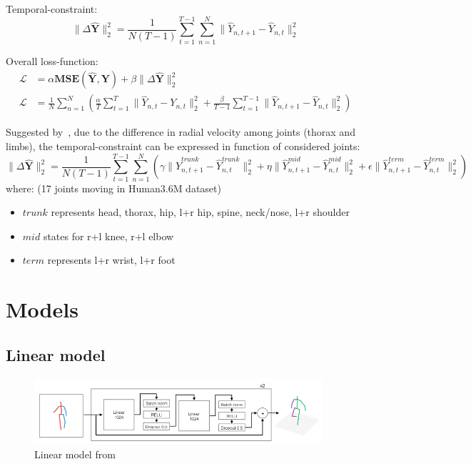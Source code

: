 \documentclass[12pt,a4paper,onecolumn]{article}
\begin{document}
Temporal-constraint:
\begin{equation}
	\lVert \Delta \widehat{\bm{Y}} \rVert_2^2 = \frac{1}{N(T-1)} \sum_{t = 1}^{T-1}\sum_{n = 1}^N \lVert \widehat{Y}_{n,t + 1} - \widehat{Y}_{n,t} \rVert_2^2
\end{equation}

Overall loss-function:
\begin{align}
	\bm{\mathcal{L}} &= \alpha\bm{MSE}(\widehat{\bm{Y}}, \bm{Y}) + \beta \lVert \Delta \widehat{\bm{Y}} \rVert_2^2\\
	\bm{\mathcal{L}} &= \frac{1}{N}\sum_{n=1}^N\left(\frac{\alpha}{T}\sum_{t=1}^T\rVert \widehat{Y}_{n,t} - Y_{n,t} \lVert_2^2 + \frac{\beta}{T-1}\sum_{t = 1}^{T-1}\lVert \widehat{Y}_{n,t + 1} - \widehat{Y}_{n,t}\rVert_2^2\right)
\end{align}

Suggested by~\cite{hossain2017exploiting}, due to the difference in radial velocity among joints (thorax and limbs), the temporal-constraint can be expressed in function of considered joints:
\begin{equation}
	\lVert \Delta \widehat{\bm{Y}} \rVert_2^2 = \frac{1}{N(T-1)} \sum_{t = 1}^{T-1}\sum_{n = 1}^N \left( \gamma \lVert \widehat{Y}_{n,t + 1}^{trunk} - \widehat{Y}_{n,t}^{trunk} \rVert_2^2 + \eta \lVert \widehat{Y}_{n,t + 1}^{mid} - \widehat{Y}_{n,t}^{mid} \rVert_2^2 + \epsilon \lVert \widehat{Y}_{n,t + 1}^{term} - \widehat{Y}_{n,t}^{term} \rVert_2^2 \right)
\end{equation}
where: (17 joints moving in Human3.6M dataset)
\begin{itemize}
	\item \(trunk\) represents head, thorax, hip, l+r hip, spine, neck/nose, l+r shoulder
	\item \(mid\) states for r+l knee, r+l elbow
	\item \(term\) represents l+r wrist, l+r foot
\end{itemize}

\section{Models}

\subsection{Linear model}

\begin{figure}[H]
	\centering
	\includegraphics[width = 0.95\textwidth]{linear_figure}
	\caption{Linear model from~\parencite{martinez2017simple}}
	\label{fig_linear_model}
\end{figure}
\end{document}
